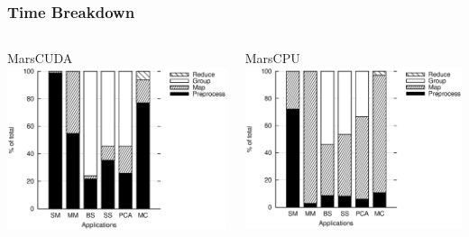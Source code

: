 \begin{frame}
\frametitle{Time Breakdown}
\begin{columns}
\begin{block}{MarsCUDA}
\includegraphics[width=1.0\linewidth]{figure/MarsGPU_Timebreakdown.eps}
\end{block}
\begin{block}{MarsCPU}
\includegraphics[width=1.0\linewidth]{figure/MarsCPU_Timebreakdown.eps}
\end{block}
\end{columns}
\end{frame}

